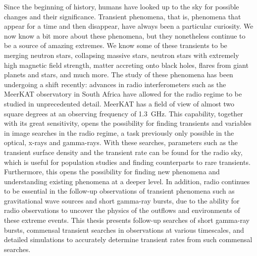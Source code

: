 \documentclass[12pt]{article}
\begin{document}
Since the beginning of history, humans have looked up to the sky for possible changes and their significance. Transient phenomena, that is, phenomena that appear for a time and then disappear, have always been a particular curiosity. We now know a bit more about these phenomena, but they nonetheless continue to be a source of amazing extremes. We know some of these transients to be merging neutron stars, collapsing massive stars, neutron stars with extremely high magnetic field strength, matter accreting onto black holes, flares from giant planets and stars, and much more. The study of these phenomena has been undergoing a shift recently: advances in radio interferometers such as the MeerKAT observatory in South Africa have allowed for the radio regime to be studied in unprecedented detail. MeerKAT has a field of view of almost two square degrees at an observing frequency of 1.3~GHz. This capability, together with its great sensitivity, opens the possibility for finding transients and variables in image searches in the radio regime, a task previously only possible in the optical, x-rays and gamma-rays. With these searches, parameters such as the transient surface density and the transient rate can be found for the radio sky, which is useful for population studies and finding counterparts to rare transients. Furthermore, this opens the possibility for finding new phenomena and understanding existing phenomena at a deeper level. In addition, radio continues to be essential in the follow-up observations of transient phenomena such as gravitational wave sources and short gamma-ray bursts, due to the ability for radio observations to uncover the physics of the outflows and environments of these extreme events. This thesis presents follow-up searches of short gamma-ray bursts, commensal transient searches in observations at various timescales, and detailed simulations to accurately determine transient rates from such commensal searches.
\doublespacing
\newpage
\tableofcontents
\newpage
\cleardoublepage

{} \label{listoffig}
\begin{center}
\listoffigures
\end{center}
\newpage
\end{document}
